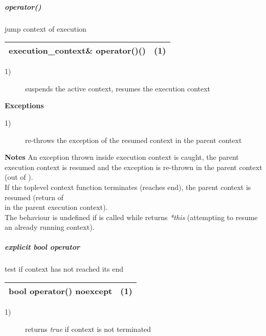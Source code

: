 \subparagraph*{operator()}
jump context of execution\\

\begin{tabular}{ l l }
    \midrule

    {\ttfamily\small\color{black}execution\_context\& {\color{blue}operator}()()} & (1)\\

    \midrule
\end{tabular}

\begin{description}
    \item[1)] suspends the active context, resumes the execution context\\
\end{description}

{\bfseries Exceptions}
\begin{description}
    \item[1)] re-throws the exception of the resumed context in the parent context\\
\end{description}

{\bfseries Notes}
\newline
An exception thrown inside execution context is caught, the parent execution
context is resumed and the exception is re-thrown in the parent context (out of
\ectxop).\\
If the toplevel context function terminates (reaches end), the parent context is
resumed (return of\\
\ectxop in the parent execution context).\\
The behaviour is undefined if  is called while 
returns \emph{*this} (attempting to resume an already running context).

\subparagraph*{explicit bool operator}
test if context has not reached its end\\

\begin{tabular}{ l l }
    \midrule

    {\ttfamily\small\color{black}{\color{blue}explicit} {\color{blue}bool} {\color{blue}operator}() {\color{blue}noexcept}} & (1)\\

    \midrule
\end{tabular}

\begin{description}
    \item[1)] returns \emph{true} if context is not terminated\\
\end{description}

